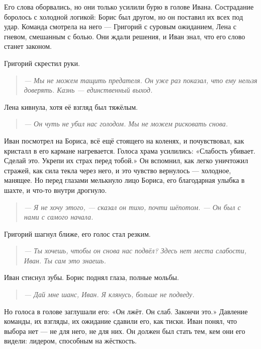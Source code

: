 \documentclass[12pt,a4paper]{book} %
\newenvironment{dialogue}{\begin{quote}\itshape}{\end{quote}}
\begin{document}
Его слова оборвались, но они только усилили бурю в голове Ивана. Сострадание боролось с холодной логикой: Борис был другом, но он поставил их всех под удар. Команда смотрела на него --- Григорий с суровым ожиданием, Лена с гневом, смешанным с болью. Они ждали решения, и Иван знал, что его слово станет законом.

Григорий скрестил руки.

\begin{dialogue}
--- Мы не можем тащить предателя. Он уже раз показал, что ему нельзя доверять. Казнь --- единственный выход.
\end{dialogue}

Лена кивнула, хотя её взгляд был тяжёлым.

\begin{dialogue}
--- Он чуть не убил нас голодом. Мы не можем рисковать снова.
\end{dialogue}

Иван посмотрел на Бориса, всё ещё стоящего на коленях, и почувствовал, как кристалл в его кармане нагревается. Голоса храма усилились: «Слабость убивает. Сделай это. Укрепи их страх перед тобой.» Он вспомнил, как легко уничтожил стражей, как сила текла через него, и это чувство вернулось --- холодное, манящее. Но перед глазами мелькнуло лицо Бориса, его благодарная улыбка в шахте, и что-то внутри дрогнуло.

\begin{dialogue}
--- Я не хочу этого, --- сказал он тихо, почти шёпотом. --- Он был с нами с самого начала.
\end{dialogue}

Григорий шагнул ближе, его голос стал резким.

\begin{dialogue}
--- Ты хочешь, чтобы он снова нас подвёл? Здесь нет места слабости, Иван. Ты сам это знаешь.
\end{dialogue}

Иван стиснул зубы. Борис поднял глаза, полные мольбы.

\begin{dialogue}
--- Дай мне шанс, Иван. Я клянусь, больше не подведу.
\end{dialogue}

Но голоса в голове заглушали его: «Он лжёт. Он слаб. Закончи это.» Давление команды, их взгляды, их ожидание сдавили его, как тиски. Иван понял, что выбора нет --- не для него, не для них. Он должен был стать тем, кем они его видели: лидером, способным на жёсткость.
\end{document}
